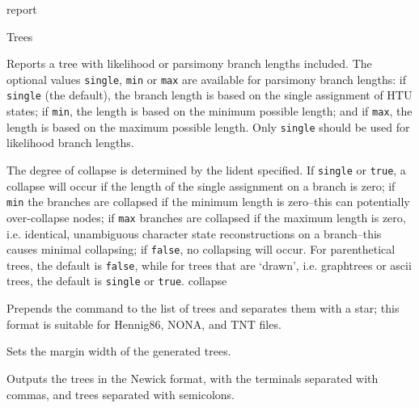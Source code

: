 \begin{command}{report}{}
\begin{arguments}
\begin{argumentgroup}{Trees}
{\begin{description}


{Reports a tree with likelihood or parsimony branch lengths included. 
The optional \poylident values \texttt{single}, \texttt{min} or \texttt{max} 
are available for parsimony branch lengths: if \texttt{single} (the default), 
the branch length is based on the single assignment of HTU states; if \texttt{min}, the length is based on the 
minimum possible length; and if \texttt{max}, the length is based 
on the maximum possible length.  Only \texttt{single} should be used for
likelihood branch lengths.}
{}


{The degree of collapse is determined by the lident specified. 
If \texttt{single} or \texttt{true}, a collapse will 
occur if the length of the single assignment on a branch is zero; 
if \texttt{min} the branches are collapsed if the minimum 
length is zero--this can potentially over-collapse nodes; if 
\texttt{max} branches are collapsed if the maximum length is 
zero, i.e. identical, unambiguous character state reconstructions 
on a branch--this causes minimal collapsing; if \texttt{false}, 
no collapsing will occur. For parenthetical trees, the default
is \texttt{false}, while for trees that are `drawn', i.e. graphtrees or
ascii trees, the default is \texttt{single} or \texttt{true}.}
{collapse}

{Prepends the  command to the list of
trees and separates them with a star; this format is
suitable for Hennig86, NONA, and TNT files.}
{}

{Sets the margin width of the generated trees.}
{}

{Outputs the trees in the Newick format, with the
terminals separated with commas, and trees separated
with semicolons.}
{}


\end{description}}
\end{argumentgroup}
\end{arguments}
\end{command}
